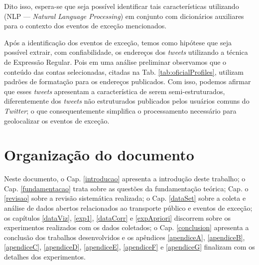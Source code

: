 \documentclass[
	12pt,				%
	oneside,			%
	a4paper,			%
	english,			%
	brazil				%
	]{abntex2ppgsi}
\begin{document}
Dito isso, espera-se que seja possível identificar tais características utilizando  (NLP --- \textit{Natural Language Processing}) em conjunto com dicionários auxiliares para o contexto dos eventos de exceção mencionados.

Após a identificação dos eventos de exceção, temos como hipótese que seja possível extrair, com confiabilidade, os endereços dos \textit{tweets} utilizando a técnica de Expressão Regular. Pois em uma análise preliminar observamos que o conteúdo das contas selecionadas, citadas na Tab. \ref{tab:oficialProfiles}, utilizam padrões de formatação para os endereços publicados. Com isso, podemos afirmar que esses \textit{tweets} apresentam a característica de serem semi-estruturados, diferentemente dos \textit{tweets} não estruturados publicados pelos usuários comuns do \textit{Twitter}; o que consequentemente simplifica o processamento necessário para geolocalizar os eventos de exceção.

\section{Organização do documento}
\label{docOrg}

Neste documento, o Cap. \ref{introducao} apresenta a introdução deste trabalho; o Cap. \ref{fundamentacao} trata sobre as questões da fundamentação teórica;  Cap. o \ref{revisao} sobre a revisão sistemática realizada; o Cap. \ref{dataSet} sobre a coleta e análise de dados abertos relacionados ao transporte público e eventos de exceção; os capítulos \ref{dataViz}, \ref{exp1}, \ref{dataCorr} e \ref{expApriori} discorrem sobre os experimentos realizados com os dados coletados; o Cap. \ref{conclusion} apresenta a conclusão dos trabalhos desenvolvidos e os apêndices \ref{apendiceA}, \ref{apendiceB}, \ref{apendiceC}, \ref{apendiceD}, \ref{apendiceE}, \ref{apendiceF} e \ref{apendiceG} finalizam com os detalhes dos experimentos.

% 
%
%
%
%
\end{document}
